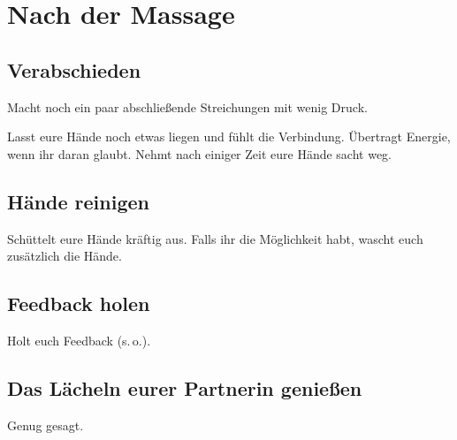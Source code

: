 \section{Nach der Massage}

\subsection{Verabschieden}

Macht noch ein paar abschließende Streichungen mit wenig Druck.

Lasst eure Hände noch etwas liegen und fühlt die Verbindung. Übertragt Energie, wenn ihr daran glaubt. Nehmt nach einiger Zeit eure Hände sacht weg.


\subsection{Hände reinigen}

Schüttelt eure Hände kräftig aus. Falls ihr die Möglichkeit habt, wascht euch zusätzlich die Hände.


\subsection{Feedback holen}

Holt euch Feedback (s.\,o.).

\subsection{Das Lächeln eurer Partnerin genießen}

Genug gesagt.

